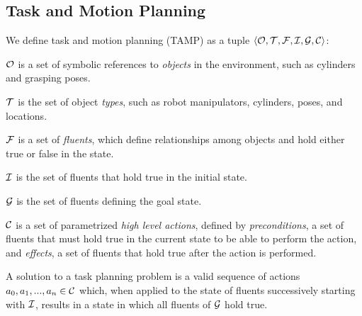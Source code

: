 \subsection{Task and Motion Planning}
We define task and motion planning (TAMP) as a tuple $\langle \mathcal{O}, \mathcal{T}, \mathcal{F}, \mathcal{I}, \mathcal{G}, \mathcal{C} \rangle$:
\begin{tightlist}
\item $\mathcal{O}$ is a set of symbolic references to \emph{objects} in the environment,
such as cylinders and grasping poses.
\item $\mathcal{T}$ is the set of object \emph{types}, such as robot manipulators, cylinders, poses, and locations.
\item $\mathcal{F}$ is a set of \emph{fluents}, which define relationships among objects and hold either
true or false in the state.
\item $\mathcal{I}$ is the set of fluents that hold true in the initial state.
\item $\mathcal{G}$ is the set of fluents defining the goal state.
\item $\mathcal{C}$ is a set of parametrized \emph{high level actions}, defined by \emph{preconditions}, a set
of fluents that must hold true in the current state to be able to perform the action,
and \emph{effects}, a set of fluents that hold true after the action is performed.
\end{tightlist}
A solution to a task planning problem is a valid sequence of actions
$a_{0}, a_{1}, ..., a_{n} \in \mathcal{C}$ which, when applied to the state of fluents
successively starting with $\mathcal{I}$, results in a state in which all fluents of
$\mathcal{G}$ hold true.




